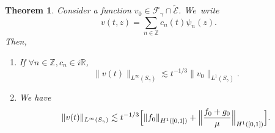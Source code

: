 \documentclass[10pt]{amsart}
\newtheorem{theorem}{Theorem}[section]
\theoremstyle{definition}
\newcommand\R{\mathbb R}
\newcommand\Z{\mathbb Z}
\newcommand\ET{\widetilde{\mathcal{E}}}
\newcommand{\Bpac}[1]{\Bigl[#1\Bigr]}
\newcommand{\absabs}[1]{\left\|#1\right\|}
\newcommand{\Babsabs}[1]{\Bigl\|#1\Bigr\|}
\begin{document}
\begin{theorem}\label{decay_linf}
Consider a function $v_0 \in \mathcal{F}_\gamma \cap \ET$. We~write
\[
v(t,z) = \sum_{n\in\Z} c_n(t) \psi_n(z). 
\]
Then,
\begin{enumerate}
\item\label{decay_linfi} If $\forall n\in \Z, c_n \in i\R$,\vspace*{-3pt}
\[
\|v(t)\|_{L^\infty(S_\gamma)} \lesssim {t^{-1/3}} \|v_0\|_{L^1(S_\gamma)}.
\]
\item\label{decay_linfii} We have\vspace*{-3pt}
\begin{equation*}
\|v(t)\|_{L^\infty(S_\gamma)}
\lesssim {t^{-1/3}} \Bpac{\absabs{{f}_0}_{H^1([0,1])}+ \Babsabs{\frac{{f}_0+{g}_0}{\mu} }_{H^1([0,1])}}.
\end{equation*}
\end{enumerate}
\end{theorem}
\end{document}
